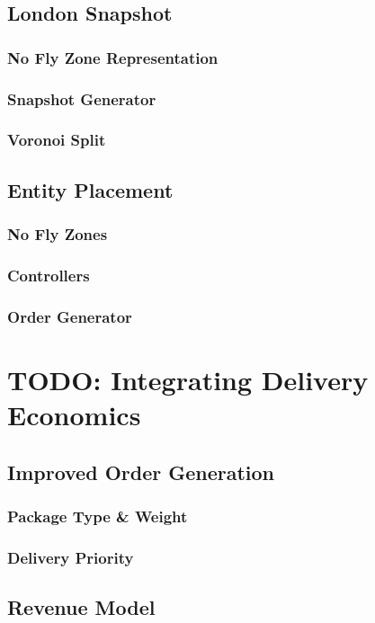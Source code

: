\documentclass[a4paper,12pt,titlepage]{article}
\begin{document}
\subsection{London Snapshot}
\subsubsection{No Fly Zone Representation}
\subsubsection{Snapshot Generator}
\subsubsection{Voronoi Split}

\subsection{Entity Placement}
\subsubsection{No Fly Zones}
\subsubsection{Controllers}
\subsubsection{Order Generator}



\newpage
\section{TODO: Integrating Delivery Economics}
\subsection{Improved Order Generation}
\subsubsection{Package Type \& Weight}
\subsubsection{Delivery Priority}

\subsection{Revenue Model}
\end{document}
